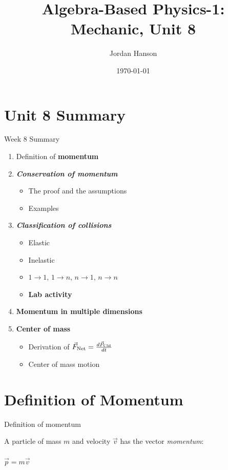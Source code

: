 \documentclass{beamer}
\title{Algebra-Based Physics-1: Mechanic, Unit 8}
\date{\today}
\author{Jordan Hanson}
\institute{Whittier College Department of Physics and Astronomy}
\begin{document}
\maketitle

\section{Unit 8 Summary}

\begin{frame}{Week 8 Summary}
\begin{enumerate}
\item Definition of \alert{\textbf{momentum}}
\item \alert{\textbf{\textit{Conservation of momentum}}}
\begin{itemize}
\item The proof and the assumptions
\item Examples
\end{itemize}
\item \alert{\textbf{\textit{Classification of collisions}}}
\begin{itemize}
\item Elastic
\item Inelastic
\item $1 \rightarrow 1$, $1 \rightarrow n$, $n \rightarrow 1$, $n \rightarrow n$
\item \textbf{Lab activity}
\end{itemize}
\item \textbf{Momentum in multiple dimensions}
\item \textbf{Center of mass}
\begin{itemize}
\item Derivation of $\vec{F}_{\rm Net} = \frac{d\vec{P}_{\rm CM}}{dt}$
\item Center of mass motion
\end{itemize}
\end{enumerate}
\end{frame}

\section{Definition of Momentum}

\begin{frame}{Definition of momentum}
\begin{tcolorbox}[colback=white,colframe=red!40!blue,title=Definition of Momentum]
\alert{A particle of mass $m$ and velocity $\vec{v}$ has the vector \textit{momentum}:} \\ \\
\alert{$\vec{p} = m\vec{v}$}
\end{tcolorbox}
\end{frame}
\end{document}
